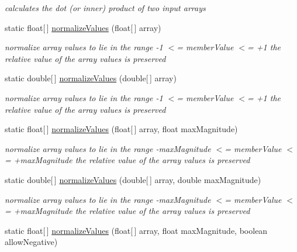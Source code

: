 \begin{DoxyCompactItemize}
\begin{DoxyCompactList}\small\item\em calculates the dot (or inner) product of two input arrays \end{DoxyCompactList}\item 
static float\mbox{[}$\,$\mbox{]} \hyperlink{classuk_1_1ac_1_1dmu_1_1iesd_1_1cascade_1_1util_1_1_array_utils_a0a294180e550b87c1c329a9b599bf688}{normalize\-Values} (float\mbox{[}$\,$\mbox{]} array)
\begin{DoxyCompactList}\small\item\em normalize array values to lie in the range -\/1 $<$= member\-Value $<$= +1 the relative value of the array values is preserved \end{DoxyCompactList}\item 
static double\mbox{[}$\,$\mbox{]} \hyperlink{classuk_1_1ac_1_1dmu_1_1iesd_1_1cascade_1_1util_1_1_array_utils_afb4f2ac43935c86ac918c1c69b158b2a}{normalize\-Values} (double\mbox{[}$\,$\mbox{]} array)
\begin{DoxyCompactList}\small\item\em normalize array values to lie in the range -\/1 $<$= member\-Value $<$= +1 the relative value of the array values is preserved \end{DoxyCompactList}\item 
static float\mbox{[}$\,$\mbox{]} \hyperlink{classuk_1_1ac_1_1dmu_1_1iesd_1_1cascade_1_1util_1_1_array_utils_afee51896ffa74faa790edc370de42ce7}{normalize\-Values} (float\mbox{[}$\,$\mbox{]} array, float max\-Magnitude)
\begin{DoxyCompactList}\small\item\em normalize array values to lie in the range -\/max\-Magnitude $<$= member\-Value $<$= +max\-Magnitude the relative value of the array values is preserved \end{DoxyCompactList}\item 
static double\mbox{[}$\,$\mbox{]} \hyperlink{classuk_1_1ac_1_1dmu_1_1iesd_1_1cascade_1_1util_1_1_array_utils_ad860c0143f52e42e6d44fcc0f7923b34}{normalize\-Values} (double\mbox{[}$\,$\mbox{]} array, double max\-Magnitude)
\begin{DoxyCompactList}\small\item\em normalize array values to lie in the range -\/max\-Magnitude $<$= member\-Value $<$= +max\-Magnitude the relative value of the array values is preserved \end{DoxyCompactList}\item 
static float\mbox{[}$\,$\mbox{]} \hyperlink{classuk_1_1ac_1_1dmu_1_1iesd_1_1cascade_1_1util_1_1_array_utils_a18b1198f711addbafe4908b5e5ebc5fa}{normalize\-Values} (float\mbox{[}$\,$\mbox{]} array, float max\-Magnitude, boolean allow\-Negative)

\end{DoxyCompactItemize}
